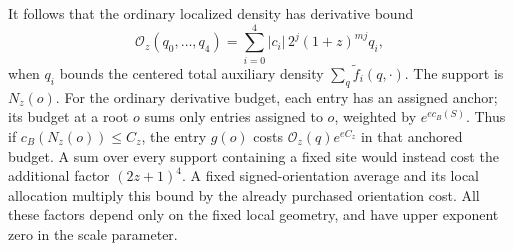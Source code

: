 It follows that the ordinary localized density has derivative
bound
\begin{equation}\label{eq:five-period-local-price}
       \mathcal O_z(q_0,\ldots,q_4)
                =\sum_{i=0}^4|c_i|\,2^j(1+z)^{mj}q_i,
\end{equation}
when $q_i$ bounds the centered total auxiliary density
$\sum_q\widetilde f_i(q,\cdot)$. The support is $N_z(o)$.
For the ordinary derivative budget, each entry has an assigned
anchor; its budget at a root $o$ sums only entries assigned to $o$,
weighted by $e^{e c_B(S)}$. Thus if $c_B(N_z(o))\le C_z$, the
entry $g(o)$ costs $\mathcal O_z(q)e^{eC_z}$ in that anchored
budget. A sum over every support containing a fixed site would
instead cost the additional factor $(2z+1)^4$.
A fixed signed-orientation average and its local allocation
multiply this bound by the already purchased orientation cost.
All these factors depend only on the fixed local geometry, and
have upper exponent zero in the scale parameter.
